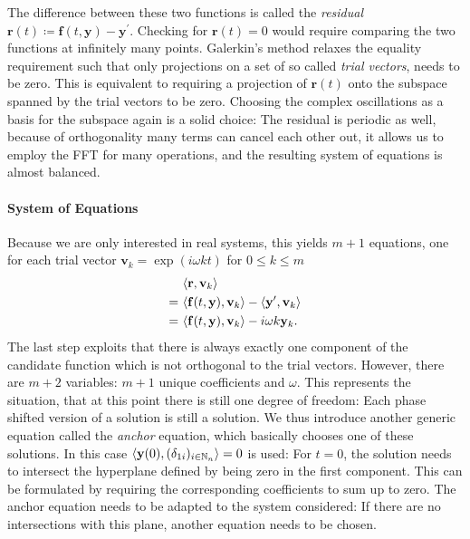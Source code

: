 The difference between these two functions is called the \emph{residual} $\mathbf{r}(t) \coloneqq \mathbf{f}(t,\mathbf{y}) - \mathbf{y}^\prime$.
Checking for $\mathbf{r}(t) = 0$ would require comparing the two functions at infinitely many points. %
Galerkin's method relaxes the equality requirement such that only projections on a set of so called \emph{trial vectors}, needs to be zero.
This is equivalent to requiring a projection of $\mathbf{r}(t)$ onto the subspace spanned by the trial vectors to be zero.
Choosing the complex oscillations as a basis for the subspace again is a solid choice: The residual is periodic as well, because of orthogonality many terms can cancel each other out, it allows us to employ the FFT for many operations, and the resulting system of equations is almost balanced.

\paragraph{System of Equations} Because we are only interested in real systems, this yields $m+1$ equations, one for each trial vector $\mathbf{v}_k = \exp\left( i \omega k t \right)$ for $0 \le k \le m$
	\begin{align*}
		& \langle \mathbf{r} , \mathbf{v}_k \rangle \\
		=\ & \langle \mathbf{f}(t,\mathbf{y}), \mathbf{v}_k \rangle - \langle \mathbf{y}^\prime, \mathbf{v}_k \rangle \\
		=\ & \langle \mathbf{f}(t,\mathbf{y}), \mathbf{v}_k \rangle - i \omega k \mathbf{y}_k \text.
	\end{align*}
The last step exploits that there is always exactly one component of the candidate function which is not orthogonal to the trial vectors.
However, there are $m+2$ variables: $m+1$ unique coefficients and $\omega$.
This represents the situation, that at this point there is still one degree of freedom: Each phase shifted version of a solution is still a solution.
We thus introduce another generic equation called the \emph{anchor} equation, which basically chooses one of these solutions.
In this case $\langle \mathbf{y}(0), (\delta_{1i})_{i \in \mathbb{N}_n} \rangle = 0$ is used:
For $t = 0$, the solution needs to intersect the hyperplane defined by being zero in the first component.
This can be formulated by requiring the corresponding coefficients to sum up to zero.
The anchor equation needs to be adapted to the system considered: If there are no intersections with this plane, another equation needs to be chosen.

